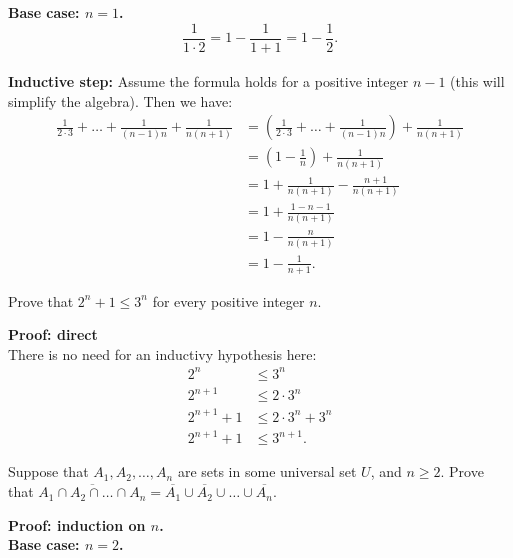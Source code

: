 \documentclass{article}
\begin{document}
\textbf{Base case: $n = 1$.}
$$\frac{1}{1\cdot 2} = 1 - \frac{1}{1+1} = 1 - \frac{1}{2}.$$
\\

\textbf{Inductive step:} Assume the formula holds for a positive integer $n - 1$ (this will simplify the algebra). Then we have:
\begin{align*}
  \frac{1}{2\cdot 3} + \ldots + \frac{1}{(n-1)n} + \frac{1}{n(n+1)} & =  (\frac{1}{2\cdot 3} + \ldots + \frac{1}{(n-1)n}) + \frac{1}{n(n+1)} \\
                                                                    & = \left(1 - \frac{1}{n}\right) + \frac{1}{n(n+1)}                      \\
                                                                    & = 1 + \frac{1}{n(n+1)} - \frac{n+1}{n(n+1)}                            \\
                                                                    & = 1 + \frac{1 - n - 1}{n(n+1)}                                         \\
                                                                    & = 1 - \frac{n}{n(n+1)}                                                 \\
                                                                    & = 1 - \frac{1}{n+1}.
\end{align*}

\begin{problem}
Prove that $2^n + 1 \leq 3^n$ for every positive integer $n$.
\end{problem}
\textbf{Proof: direct}
\\

There is no need for an inductivy hypothesis here:
\begin{align*}
  2^n         & \leq 3^n              \\
  2^{n+1}     & \leq 2\cdot 3^n       \\
  2^{n+1} + 1 & \leq 2\cdot 3^n + 3^n \\
  2^{n+1} + 1 & \leq 3^{n+1}.
\end{align*}

\begin{problem}
Suppose that $A_1, A_2, \ldots, A_n$ are sets in some universal set $U$, and $n \geq 2$. Prove that $\overline{A_1 \cap A_2 \cap \ldots \cap A_n} = \overline{A_1} \cup \overline{A_2} \cup \ldots \cup \overline{A_n}$.
\end{problem}
\textbf{Proof: induction on $n$.}
\\
\textbf{Base case: $n = 2$.}
\\
\end{document}

